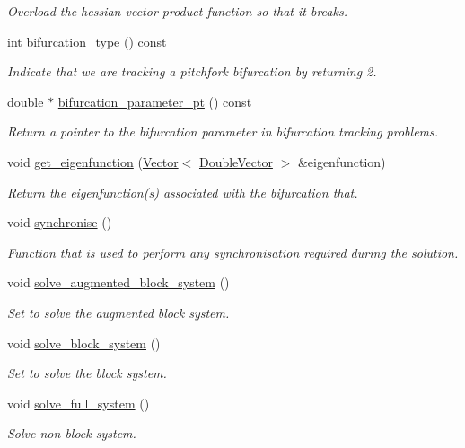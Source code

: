 \begin{DoxyCompactItemize}
\begin{DoxyCompactList}\small\item\em Overload the hessian vector product function so that it breaks. \end{DoxyCompactList}\item 
int \hyperlink{classoomph_1_1PitchForkHandler_aadc4f0b5dfb82cf171b91432536d1679}{bifurcation\+\_\+type} () const
\begin{DoxyCompactList}\small\item\em Indicate that we are tracking a pitchfork bifurcation by returning 2. \end{DoxyCompactList}\item 
double $\ast$ \hyperlink{classoomph_1_1PitchForkHandler_a7363cb34d716d64d891af5018e09d807}{bifurcation\+\_\+parameter\+\_\+pt} () const
\begin{DoxyCompactList}\small\item\em Return a pointer to the bifurcation parameter in bifurcation tracking problems. \end{DoxyCompactList}\item 
void \hyperlink{classoomph_1_1PitchForkHandler_a9d5e1388fe0ede6834a249b98168b71a}{get\+\_\+eigenfunction} (\hyperlink{classoomph_1_1Vector}{Vector}$<$ \hyperlink{classoomph_1_1DoubleVector}{Double\+Vector} $>$ \&eigenfunction)
\begin{DoxyCompactList}\small\item\em Return the eigenfunction(s) associated with the bifurcation that. \end{DoxyCompactList}\item 
void \hyperlink{classoomph_1_1PitchForkHandler_a23a67d7212e25108e40cf9b4606f4478}{synchronise} ()
\begin{DoxyCompactList}\small\item\em Function that is used to perform any synchronisation required during the solution. \end{DoxyCompactList}\item 
void \hyperlink{classoomph_1_1PitchForkHandler_ad0b0920383bcbdab5df1f43db5affa47}{solve\+\_\+augmented\+\_\+block\+\_\+system} ()
\begin{DoxyCompactList}\small\item\em Set to solve the augmented block system. \end{DoxyCompactList}\item 
void \hyperlink{classoomph_1_1PitchForkHandler_ad193c3d67741edd60b023c94e42c8802}{solve\+\_\+block\+\_\+system} ()
\begin{DoxyCompactList}\small\item\em Set to solve the block system. \end{DoxyCompactList}\item 
void \hyperlink{classoomph_1_1PitchForkHandler_a27325616f4342d159f6f5e7c82ccdf98}{solve\+\_\+full\+\_\+system} ()
\begin{DoxyCompactList}\small\item\em Solve non-\/block system. \end{DoxyCompactList}\end{DoxyCompactItemize}
